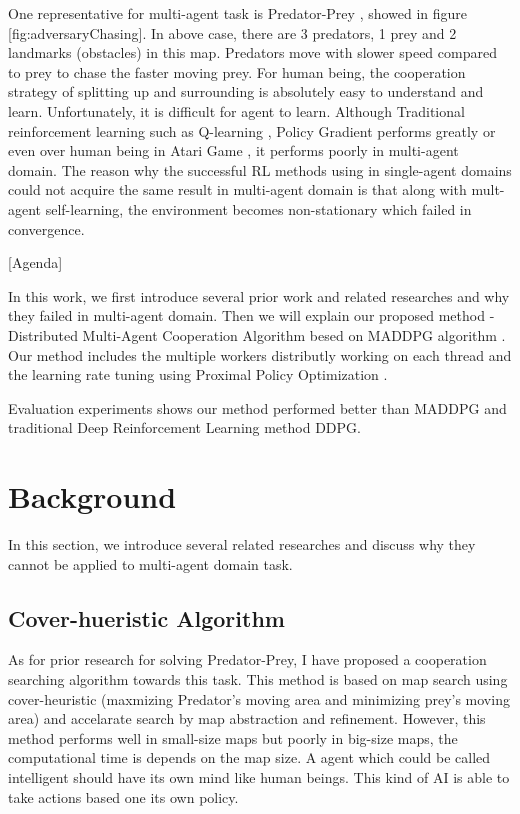 \documentclass[11pt,twocolumn]{jarticle} %
\begin{document}
One representative for multi-agent task is Predator-Prey \cite{4}, showed in figure [fig:adversaryChasing]. In above case, there are 
3 predators, 1 prey and 2 landmarks (obstacles) in this map. Predators move with slower speed compared to prey to chase the faster moving prey. For human being, the cooperation strategy of splitting up and surrounding is absolutely easy to understand and learn. Unfortunately, it is difficult for agent to learn. Although Traditional reinforcement learning such as Q-learning \cite{5}, Policy Gradient \cite{6} performs greatly or even over human being in Atari Game \cite{7}, it performs poorly in multi-agent domain. The reason why the successful RL methods using in single-agent domains could not acquire the same result in multi-agent domain is that along with mult-agent self-learning, the environment becomes non-stationary which failed in convergence. \par

[Agenda] \par
In this work, we first introduce several prior work and related researches and why they failed in multi-agent domain. Then we will explain our proposed method - Distributed Multi-Agent Cooperation Algorithm besed on MADDPG algorithm \cite{4}. Our method includes the multiple workers distributly working on each thread and the learning rate tuning using Proximal Policy Optimization \cite{8}. \par

Evaluation experiments shows our method performed better than MADDPG and traditional Deep Reinforcement Learning method DDPG. \par

\section{Background} 
In this section, we introduce several related researches and discuss why they cannot be applied to multi-agent domain task.
\subsection{Cover-hueristic Algorithm}
As for prior research for solving Predator-Prey, I have proposed a cooperation searching algorithm  \cite{9} towards this task. This method is based on map search using cover-heuristic (maxmizing Predator's moving area and minimizing prey's moving area) and accelarate search by map abstraction and refinement. However, this method performs well in small-size maps but poorly in big-size maps, the computational time is depends on the map size. A agent which could be called intelligent should have its own mind like human beings. This kind of AI is able to take actions based one its own policy.\par
\end{document}
